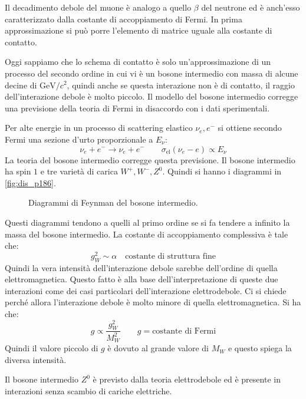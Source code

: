 Il decadimento debole del muone è analogo a quello $\beta$ del neutrone ed è 
anch'esso caratterizzato dalla
costante di accoppiamento di Fermi.
In prima approssimazione si può porre l'elemento di matrice uguale alla 
costante di contatto.

Oggi sappiamo che lo schema di contatto è solo un'approssimazione di un 
processo del secondo ordine in cui vi è
un bosone intermedio con massa di alcune decine di 
$\si{\giga\electronvolt}/c^2$, quindi anche se questa
interazione non è di contatto, il raggio dell'interazione debole è molto 
piccolo.
Il modello del bosone intermedio corregge una previsione della teoria di Fermi 
in disaccordo con i dati sperimentali.

Per alte energie in un processo di scattering elastico $\nu_e,e^-$ si ottiene 
secondo Fermi una sezione
d'urto proporzionale a $E_{\nu}$:
\[
\nu_e+e^-\rightarrow \nu_e+e^-\qquad \sigma_{\text{el}}(\nu_e-e)\propto E_{\nu}
\]
La teoria del bosone intermedio corregge questa previsione. Il bosone 
intermedio ha spin $1$ e tre varietà di
carica $W^+,W^-,Z^0$.
Quindi si hanno i diagrammi in \autoref{fig:dis_p186}.
\begin{figure}[!h]
  \centering
  \caption{Diagrammi di Feynman del bosone intermedio.}
  \label{fig:dis_p186}
  
\end{figure}

Questi diagrammi tendono a quelli al primo ordine se si fa tendere a infinito 
la massa del bosone intermedio.
La costante di accoppiamento complessiva è tale che:
\[
g_{W}^2\sim\alpha\quad\text{costante di struttura fine}
\]
Quindi la vera intensità dell'interazione debole sarebbe dell'ordine di quella 
elettromagnetica.
Questo fatto è alla base dell'interpretazione di queste due interazioni come 
dei casi particolari dell'interazione elettrodebole.
Ci si chiede perché allora l'interazione debole è molto minore di quella 
elettromagnetica. Si ha che:
\[
g\propto\frac{g_W^2}{M_W^2}\qquad g=\text{costante di Fermi}
\]
Quindi il valore piccolo di $g$ è dovuto al grande valore di $M_W$ e questo 
spiega la diversa intensità.

Il bosone intermedio $Z^0$ è previsto dalla teoria elettrodebole ed è 
presente in interazioni senza scambio di cariche elettriche.
